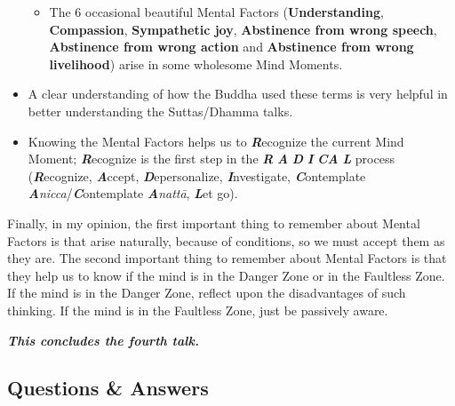 \begin{itemize}
\begin{itemize}
\item The 6 occasional beautiful Mental Factors (\textbf{Understanding}, \textbf{Compassion}, \textbf{Sympathetic joy}, \textbf{Abstinence from wrong speech}, \textbf{Abstinence from wrong action} and \textbf{Abstinence from wrong livelihood}) arise in some wholesome Mind Moments.

\end{itemize}

\item A clear understanding of how the Buddha used these terms is very helpful in better understanding the Suttas/Dhamma talks.

\item Knowing the Mental Factors helps us to \textbf{\textit{R}}ecognize the current Mind Moment; \textbf{\textit{R}}ecognize is the first step in the \textbf{\textit{R}} \textbf{\textit{A}} \textbf{\textit{D}} \textbf{\textit{I}} \textbf{\textit{CA}} \textbf{\textit{L}} process (\textbf{\textit{R}}ecognize, \textbf{\textit{A}}ccept, \textbf{\textit{D}}epersonalize, \textbf{\textit{I}}nvestigate, \textbf{\textit{C}}ontemplate \textbf{\textit{A}}\textit{nicca}/\textbf{\textit{C}}ontemplate \textbf{\textit{A}}\textit{nattā}, \textbf{\textit{L}}et go).

\end{itemize}

Finally, in my opinion, the first important thing to remember about Mental Factors is that arise naturally, because of conditions, so we must accept them as they are. The second important thing to remember about Mental Factors is that they help us to know if the mind is in the Danger Zone or in the Faultless Zone. If the mind is in the Danger Zone, reflect upon the disadvantages of such thinking. If the mind is in the Faultless Zone, just be passively aware.

\begin{center}
\textbf{\textit{This concludes the fourth talk.}} \\
\end{center}

\newpage

\subsection*{Questions \& Answers}


